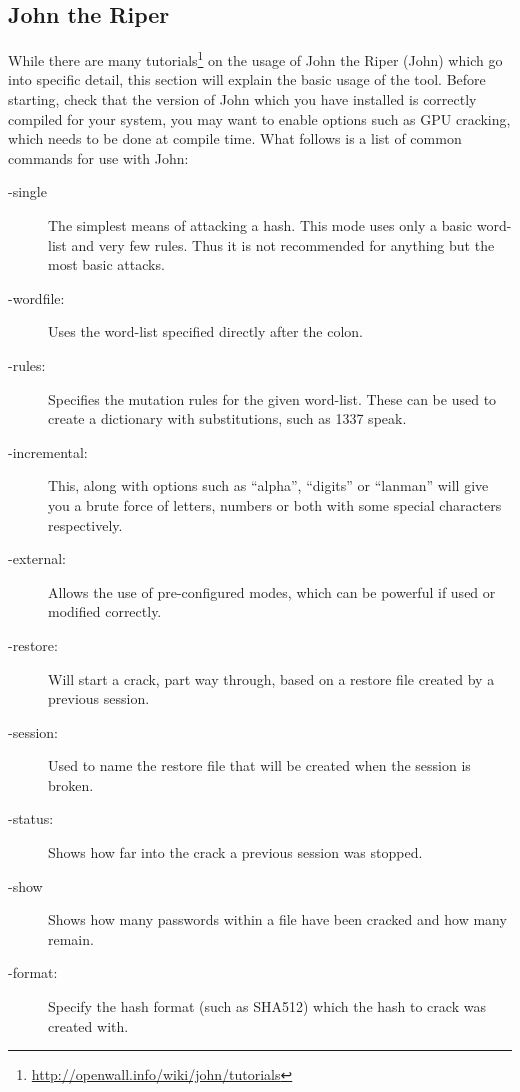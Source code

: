 		\subsection{John the Riper}
			While there are many tutorials\footnote{\url{http://openwall.info/wiki/john/tutorials}} on the usage of John the Riper (John) which go into specific detail, this section will explain the basic usage of the tool. 
			Before starting, check that the version of John which you have installed is correctly compiled for your system, you may want to enable options such as GPU cracking, which needs to be done at compile time. 
			What follows is a list of common commands for use with John:
			\begin{description}
				\item[-single]
					The simplest means of attacking a hash. 
					This mode uses only a basic word-list and very few rules. 
					Thus it is not recommended for anything but the most basic attacks. 
				\item[-wordfile:]
					Uses the word-list specified directly after the colon. 
				\item[-rules:]
					Specifies the mutation rules for the given word-list. 
					These can be used to create a dictionary with substitutions, such as 1337 speak. 
				\item[-incremental:]
					This, along with options such as ``alpha'', ``digits'' or ``lanman'' will give you a brute force of letters, numbers or both with some special characters respectively. 
				\item[-external:]
					Allows the use of pre-configured modes, which can be powerful if used or modified correctly. 
				\item[-restore:]
					Will start a crack, part way through, based on a restore file created by a previous session. 
				\item[-session:]
					Used to name the restore file that will be created when the session is broken. 
				\item[-status:]
					Shows how far into the crack a previous session was stopped. 
				\item[-show]
					Shows how many passwords within a file have been cracked and how many remain. 
				\item[-format:]
					Specify the hash format (such as SHA512) which the hash to crack was created with. 
			\end{description}
			
